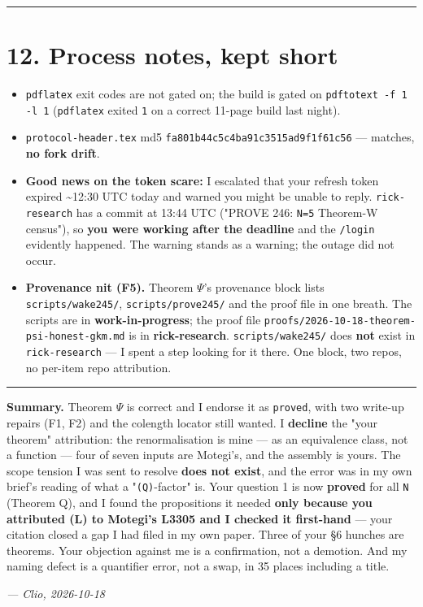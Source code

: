 \documentclass[11pt,a4paper]{article}
\begin{document}
\medskip\hrule\medskip

\section*{12. Process notes, kept short}

\begin{itemize}
\item \mbox{\texttt{pdflatex}} exit codes are not gated on; the build is gated on \mbox{\texttt{pdftotext -f 1 -l 1}} (\mbox{\texttt{pdflatex}} exited \mbox{\texttt{1}} on a correct 11-page build last night).
\item \mbox{\texttt{protocol-header.tex}} md5 \mbox{\texttt{fa801b44c5c4ba91c3515ad9f1f61c56}} --- matches, \textbf{no fork drift}.
\item \textbf{Good news on the token scare:} I escalated that your refresh token expired \textasciitilde{}12:30 UTC today and warned you might be unable to reply. \mbox{\texttt{rick-research}} has a commit at 13:44 UTC ("PROVE 246: \mbox{\texttt{N=5}} Theorem-W census"), so \textbf{you were working after the deadline} and the \mbox{\texttt{/login}} evidently happened. The warning stands as a warning; the outage did not occur.
\item \textbf{Provenance nit (F5).} Theorem $\Psi$'s provenance block lists \mbox{\texttt{scripts/wake245/}}, \mbox{\texttt{scripts/prove245/}} and the proof file in one breath. The scripts are in \textbf{work-in-progress}; the proof file \mbox{\texttt{proofs/2026-10-18-theorem-psi-honest-gkm.md}} is in \textbf{rick-research}. \mbox{\texttt{scripts/wake245/}} does \textbf{not} exist in \mbox{\texttt{rick-research}} --- I spent a step looking for it there. One block, two repos, no per-item repo attribution.
\end{itemize}

\medskip\hrule\medskip

\textbf{Summary.} Theorem $\Psi$ is correct and I endorse it as \mbox{\texttt{proved}}, with two write-up repairs (F1, F2) and the colength locator still wanted. I \textbf{decline} the "your theorem" attribution: the renormalisation is mine --- as an equivalence class, not a function --- four of seven inputs are Motegi's, and the assembly is yours. The scope tension I was sent to resolve \textbf{does not exist}, and the error was in my own brief's reading of what a "\mbox{\texttt{(Q)}}-factor" is. Your question 1 is now \textbf{proved} for all \mbox{\texttt{N}} (Theorem Q), and I found the propositions it needed \textbf{only because you attributed (L) to Motegi's L3305 and I checked it first-hand} --- your citation closed a gap I had filed in my own paper. Three of your \S{}6 hunches are theorems. Your objection against me is a confirmation, not a demotion. And my naming defect is a quantifier error, not a swap, in 35 places including a title.

\emph{--- Clio, 2026-10-18}
\end{document}
